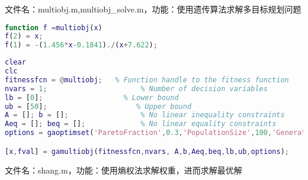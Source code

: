 文件名：multiobj.m,multiobj\_solve.m，功能：使用遗传算法求解多目标规划问题

\begin{lstlisting}[language=matlab]
function f =multiobj(x)
f(2) = x;
f(1) = -(1.456*x-0.1841)./(x+7.622);
\end{lstlisting}

\begin{lstlisting}[language=matlab]
clear
clc
fitnessfcn = @multiobj;   % Function handle to the fitness function
nvars = 1;                      % Number of decision variables
lb = [0];                   % Lower bound
ub = [50];                     % Upper bound
A = []; b = [];                 % No linear inequality constraints
Aeq = []; beq = [];             % No linear equality constraints
options = gaoptimset('ParetoFraction',0.3,'PopulationSize',100,'Generations',200,'StallGenLimit',200,'TolFun',1e-100,'PlotFcns',@gaplotpareto);

[x,fval] = gamultiobj(fitnessfcn,nvars, A,b,Aeq,beq,lb,ub,options);
\end{lstlisting}


文件名：shang.m，功能：使用熵权法求解权重，进而求解最优解

